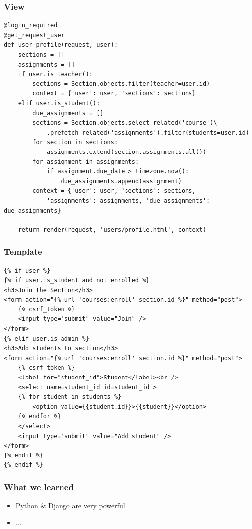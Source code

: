\documentclass{beamer}
\begin{document}
\begin{frame}[fragile]
\frametitle{View}

\begin{lstlisting}[basicstyle=\tiny]
@login_required
@get_request_user
def user_profile(request, user):
    sections = []
    assignments = []
    if user.is_teacher():
        sections = Section.objects.filter(teacher=user.id)
        context = {'user': user, 'sections': sections}
    elif user.is_student():
        due_assignments = []
        sections = Section.objects.select_related('course')\
            .prefetch_related('assignments').filter(students=user.id)
        for section in sections:
            assignments.extend(section.assignments.all())
        for assignment in assignments:
            if assignment.due_date > timezone.now():
                due_assignments.append(assignment)
        context = {'user': user, 'sections': sections, 
            'assignments': assignments, 'due_assignments': due_assignments}

    return render(request, 'users/profile.html', context)  
\end{lstlisting}
\end{frame}




\begin{frame}[fragile]
\frametitle{Template}

\begin{lstlisting}[basicstyle=\tiny]
{% if user %}
{% if user.is_student and not enrolled %}
<h3>Join the Section</h3>
<form action="{% url 'courses:enroll' section.id %}" method="post">
    {% csrf_token %}
    <input type="submit" value="Join" />
</form>
{% elif user.is_admin %}
<h3>Add students to section</h3>
<form action="{% url 'courses:enroll' section.id %}" method="post">
    {% csrf_token %}
    <label for="student_id">Student</label><br />
    <select name=student_id id=student_id >
    {% for student in students %}
        <option value={{student.id}}>{{student}}</option>
    {% endfor %}
    </select>
    <input type="submit" value="Add student" />
</form>
{% endif %}
{% endif %}  
\end{lstlisting}
\end{frame}


\begin{frame}[fragile]
\frametitle{What we learned}

\begin{itemize}
	\item Python \& Django are very powerful
	\item ...
\end{itemize}

\end{frame}
\end{document}

